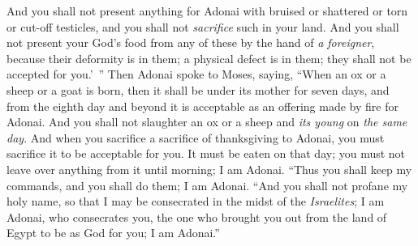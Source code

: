 \begin{biblechapter}
\verse And you shall not present anything for Adonai with bruised or shattered or torn or cut-off testicles, and you shall not \textit{sacrifice} such in your land.
\verse And you shall not present your God’s food from any of these by the hand of \textit{a foreigner}, because their deformity is in them; a physical defect is in them; they shall not be accepted for you.’ ”
\verse Then Adonai spoke to Moses, saying,
\verse “When an ox or a sheep or a goat is born, then it shall be under its mother for seven days, and from the eighth day and beyond it is acceptable as an offering made by fire for Adonai.
\verse And you shall not slaughter an ox or a sheep and \textit{its young} on \textit{the same day}.
\verse And when you sacrifice a sacrifice of thanksgiving to Adonai, you must sacrifice it to be acceptable for you.
\verse It must be eaten on that day; you must not leave over anything from it until morning; I am Adonai.
\verse “Thus you shall keep my commands, and you shall do them; I am Adonai.
\verse “And you shall not profane my holy name, so that I may be consecrated in the midst of the \textit{Israelites}; I am Adonai, who consecrates you,
\verse the one who brought you out from the land of Egypt to be as God for you; I am Adonai.”
\end{biblechapter}

